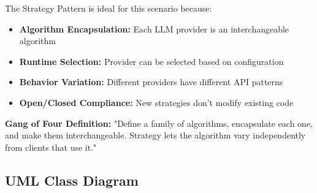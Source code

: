 \documentclass[11pt,a4paper]{article}
\begin{document}
The Strategy Pattern is ideal for this scenario because:

\begin{itemize}
    \item \textbf{Algorithm Encapsulation:} Each LLM provider is an interchangeable algorithm
    \item \textbf{Runtime Selection:} Provider can be selected based on configuration
    \item \textbf{Behavior Variation:} Different providers have different API patterns
    \item \textbf{Open/Closed Compliance:} New strategies don't modify existing code
\end{itemize}

\textbf{Gang of Four Definition:} "Define a family of algorithms, encapsulate each one, and make them interchangeable. Strategy lets the algorithm vary independently from clients that use it."

\subsection{UML Class Diagram}
\end{document}
